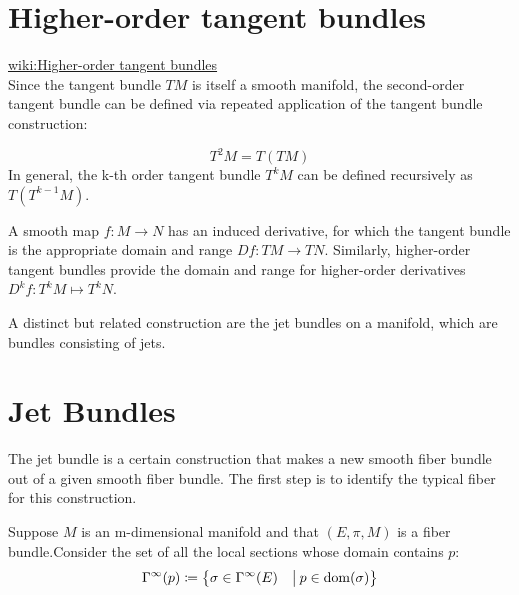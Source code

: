 \documentclass[a4paper,12pt]{scrartcl}    %
\begin{document}
\section{Higher-order tangent bundles}
	\begin{Warning}
	\href{https://en.wikipedia.org/wiki/Tangent_bundle}{wiki:Higher-order tangent bundles}\\
Since the tangent bundle $TM$ is itself a smooth manifold, the second-order tangent bundle can be defined via repeated application of the tangent bundle construction:

$$T^2 M = T(TM)$$
In general, the k-th order tangent bundle $T^k M$ can be defined recursively as $T (T^{k-1}M) $.

A smooth map $f : M \rightarrow N$ has an induced derivative, for which the tangent bundle is the appropriate domain and range $Df : TM \rightarrow TN$. 
Similarly, higher-order tangent bundles provide the domain and range for higher-order derivatives $D^k f : T^k M \mapsto T^k N$.

A distinct but related construction are the jet bundles on a manifold, which are bundles consisting of jets.
	\end{Warning}

\section{Jet Bundles}
The jet bundle is a certain construction that makes a new smooth fiber bundle out of a given smooth fiber bundle. The first step is to identify the typical fiber for this construction.

Suppose $M$ is an m-dimensional manifold and that $(E, \pi, M)$ is a fiber bundle.Consider the set of all the local sections whose domain contains $p$:
	\begin{displaymath}
		\Gamma^\infty (p) \coloneqq \big\{ \sigma \in \Gamma^\infty(E) \quad \big\vert\:  p \in \mathrm{dom}(\sigma)  \big\}
	\end{displaymath}
\end{document}
